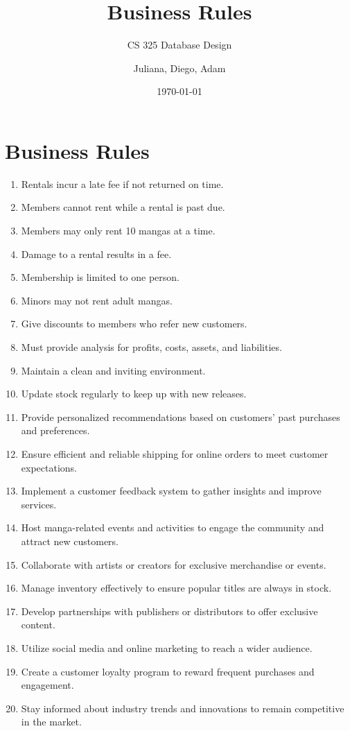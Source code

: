 \documentclass{scrartcl}
\title{Business Rules}
\subtitle{CS 325 Database Design}
\author{Juliana, Diego, Adam}
\date{\today}
\begin{document}
\maketitle


\section*{Business Rules}

\begin{enumerate}
\item Rentals incur a late fee if not returned on time.
\item Members cannot rent while a rental is past due.
\item Members may only rent 10 mangas at a time.
\item Damage to a rental results in a fee.
\item Membership is limited to one person.
\item Minors may not rent adult mangas.
\item Give discounts to members who refer new customers.
\item Must provide analysis for profits, costs, assets, and liabilities.
\item Maintain a clean and inviting environment.
\item Update stock regularly to keep up with new releases.
\item Provide personalized recommendations based on customers' past purchases and preferences.
\item Ensure efficient and reliable shipping for online orders to meet customer expectations.
\item Implement a customer feedback system to gather insights and improve services.
\item Host manga-related events and activities to engage the community and attract new customers.
\item Collaborate with artists or creators for exclusive merchandise or events.
\item Manage inventory effectively to ensure popular titles are always in stock.
\item Develop partnerships with publishers or distributors to offer exclusive content.
\item Utilize social media and online marketing to reach a wider audience.
\item Create a customer loyalty program to reward frequent purchases and engagement.
\item Stay informed about industry trends and innovations to remain competitive in the market.
\end{enumerate}
\end{document}
